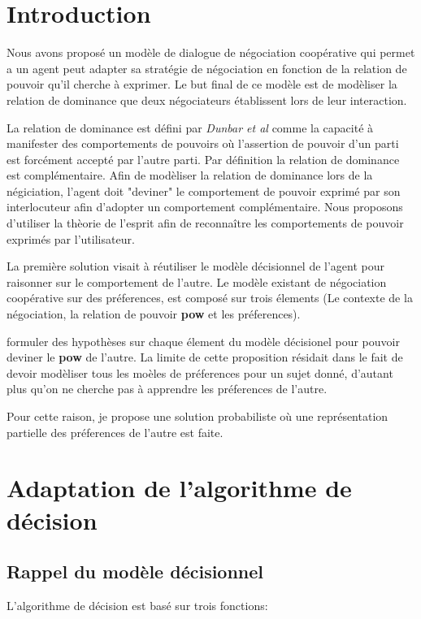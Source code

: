 \documentclass{llncs}
\begin{document}
	
	\section{Introduction}
	Nous avons propos\'e un mod\`ele de dialogue de n\'egociation coop\'erative  qui permet a un agent peut adapter sa strat\'egie de n\'egociation en fonction de la relation de pouvoir qu'il cherche \`a exprimer. 
	Le but final de ce mod\`ele est  de mod\`eliser la relation de dominance que deux n\'egociateurs \'etablissent lors de leur interaction. 
	\par La relation de dominance est d\'efini par \emph{Dunbar et \textit{al}} comme la capacit\'e  \`a manifester des comportements de pouvoirs o\`u l'assertion de pouvoir d'un parti est forc\'ement accept\'e par l'autre parti. Par d\'efinition la relation de dominance est compl\'ementaire. 
	Afin de mod\`eliser la relation de dominance lors de la n\'egiciation, l'agent doit "deviner" le comportement de pouvoir exprim\'e par son interlocuteur afin d'adopter un comportement compl\'ementaire. 
	Nous proposons d'utiliser la th\`eorie de l'esprit afin de reconna\^itre les comportements de pouvoir exprim\'es par l'utilisateur. 
	
	La premi\`ere solution visait \`a r\'eutiliser le mod\`ele d\'ecisionnel de l'agent pour raisonner sur le comportement de l'autre. Le mod\`ele existant de n\'egociation coop\'erative sur des pr\'eferences, est composé sur trois \'elements (Le contexte de la n\'egociation, la relation de pouvoir \textbf{pow} et les pr\'eferences).
	
	formuler des hypoth\`eses sur chaque \'element du mod\`ele d\'ecisionel pour pouvoir deviner le \textbf{pow} de l'autre. La limite de cette proposition r\'esidait dans le fait de devoir mod\`eliser tous les mo\`eles de pr\'eferences pour un sujet donn\'e, d'autant plus qu'on ne cherche pas \`a apprendre les pr\'eferences de l'autre.
	
	Pour cette raison, je propose une solution probabiliste où une repr\'esentation partielle des pr\'eferences de l'autre est faite. 
	
	\section{Adaptation de l'algorithme de d\'ecision}
	
	\subsection{Rappel du mod\`ele d\'ecisionnel}
	L'algorithme de d\'ecision est bas\'e sur trois fonctions:
\end{document}
